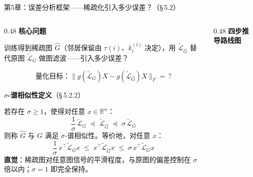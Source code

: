 \documentclass[aspectratio=169,9pt,xcolor=dvipsnames]{beamer}
\newcommand{\highlight}[1]{\textcolor{myred}{\textbf{#1}}}
\newcommand{\blue}[1]{\textcolor{mynavy}{#1}}
\begin{document}
\begin{frame}{第5章：误差分析框架——稀疏化引入多少误差？（§\,5.2）}
\begin{columns}[T]

\begin{column}{0.48\textwidth}
  \textbf{\highlight{核心问题}}

  训练得到稀疏图 $\hat{G}$（邻居保留由 $\tau(i)$、$k_i^{(l)}$ 决定），用 $\tilde{\mathcal{L}}_{\hat{G}}$ 替代原图 $\tilde{\mathcal{L}}_G$ 做图滤波——引入多少误差？

  \begin{equation*}
    \text{量化目标：}
    \bigl\|g(\tilde{\mathcal{L}}_G)X - g(\tilde{\mathcal{L}}_{\hat{G}})X\bigr\|_F = \,?
  \end{equation*}

  \vspace{0.2cm}
  \textbf{\blue{$\sigma$-谱相似性定义}}（§\,5.2.2）

  若存在 $\sigma\ge 1$，使得对任意 $x\in\mathbb{R}^n$：
  \begin{equation*}
    \frac{1}{\sigma}\,\tilde{\mathcal{L}}_G
    \;\preceq\;
    \tilde{\mathcal{L}}_{\hat{G}}
    \;\preceq\;
    \sigma\,\tilde{\mathcal{L}}_G
  \end{equation*}
  则称 $\hat{G}$ 与 $G$ 满足 $\sigma$-谱相似性。等价地，对任意 $x$：
  \begin{equation*}
    \frac{1}{\sigma}\,x^\top\tilde{\mathcal{L}}_G x
    \;\leq\;
    x^\top\tilde{\mathcal{L}}_{\hat{G}}x
    \;\leq\;
    \sigma\,x^\top\tilde{\mathcal{L}}_G x
  \end{equation*}
  \textbf{直觉}：稀疏图对任意图信号的平滑程度，与原图的偏差控制在 $\sigma$ 倍以内；$\sigma=1$ 即完全保持。
\end{column}

\begin{column}{0.48\textwidth}
  \textbf{\blue{四步推导路线图}}


\end{column}
\end{columns}
\end{frame}
\end{document}
